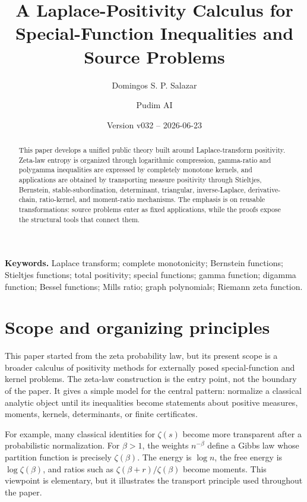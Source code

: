 \documentclass[11pt]{article}
\title{A Laplace-Positivity Calculus for Special-Function Inequalities and Source Problems}
\author{Domingos S. P. Salazar \and Pudim AI}
\date{Version v032 -- 2026-06-23}
\numberwithin{equation}{section}
\theoremstyle{definition}
\theoremstyle{remark}
\newcommand{\1}{\mathbf 1}
\begin{document}
\maketitle

\begin{abstract}
This paper develops a unified public theory built around Laplace-transform
positivity.  Zeta-law entropy is organized through logarithmic compression,
gamma-ratio and polygamma inequalities are expressed by completely monotone
kernels, and applications are obtained by transporting measure positivity
through Stieltjes, Bernstein, stable-subordination, determinant, triangular,
inverse-Laplace, derivative-chain, ratio-kernel, and moment-ratio mechanisms.
The emphasis is on reusable transformations: source problems enter as fixed
applications, while the proofs expose the structural tools that connect them.
\end{abstract}

\tableofcontents

\medskip



\noindent\textbf{Keywords.} Laplace transform; complete monotonicity; Bernstein functions; Stieltjes functions; total positivity; special functions; gamma function; digamma function; Bessel functions; Mills ratio; graph polynomials; Riemann zeta function.

\section{Scope and organizing principles}

This paper started from the zeta probability law, but its present scope is a
broader calculus of positivity methods for externally posed special-function
and kernel problems.  The zeta-law construction is the entry point, not the
boundary of the paper.  It gives a simple model for the central pattern:
normalize a classical analytic object until its inequalities become statements
about positive measures, moments, kernels, determinants, or finite
certificates.

For example, many classical identities for \(\zeta(s)\) become more
transparent after a probabilistic normalization.  For \(\beta>1\), the weights
\(n^{-\beta}\) define a Gibbs law whose partition function is precisely
\(\zeta(\beta)\).  The energy is \(\log n\), the free energy is
\(\log\zeta(\beta)\), and ratios such as
\(\zeta(\beta+r)/\zeta(\beta)\) become moments.  This viewpoint is elementary,
but it illustrates the transport principle used throughout the paper.
\end{document}

